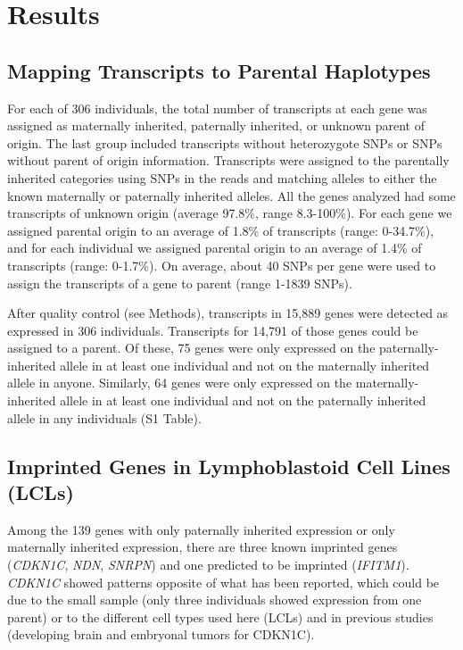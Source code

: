 \section{Results}\label{ch03-results}
\subsection{Mapping Transcripts to Parental Haplotypes}\label{Mapping Transcripts to Parental Haplotypes}
For each of 306 individuals, the total number of transcripts at each gene was assigned as maternally inherited, paternally inherited, or unknown parent of origin. The last group included transcripts without heterozygote SNPs or SNPs without parent of origin information. Transcripts were assigned to the parentally inherited categories using SNPs in the reads and matching alleles to either the known maternally or paternally inherited alleles. All the genes analyzed had some transcripts of unknown origin (average 97.8\%, range 8.3-100\%). For each gene we assigned parental origin to an average of 1.8\% of transcripts (range: 0-34.7\%), and for each individual we assigned parental origin to an average of 1.4\% of transcripts (range: 0-1.7\%). On average, about 40 SNPs per gene were used to assign the transcripts of a gene to parent (range 1-1839 SNPs). 

After quality control (see Methods), transcripts in 15,889 genes were detected as expressed in 306 individuals. Transcripts for 14,791 of those genes could be assigned to a parent. Of these, 75 genes were only expressed on the paternally-inherited allele in at least one individual and not on the maternally inherited allele in anyone. Similarly, 64 genes were only expressed on the maternally-inherited allele in at least one individual and not on the paternally inherited allele in any individuals (S1 Table).

\subsection{Imprinted Genes in Lymphoblastoid Cell Lines (LCLs)}\label{Imprinted Genes in Lymphoblastoid Cell Lines (LCLs)}
Among the 139 genes with only paternally inherited expression or only maternally inherited expression, there are three known imprinted genes (\emph{CDKN1C}, \emph{NDN}, \emph{SNRPN}) and one predicted to be imprinted (\emph{IFITM1})\cite{Luedi:2007ib}. \emph{CDKN1C} showed patterns opposite of what has been reported\cite{Hatada:1995jf,Matsuoka:1996uq}, which could be due to the small sample (only three individuals showed expression from one parent) or to the different cell types used here (LCLs) and in previous studies (developing brain and embryonal tumors for CDKN1C).

